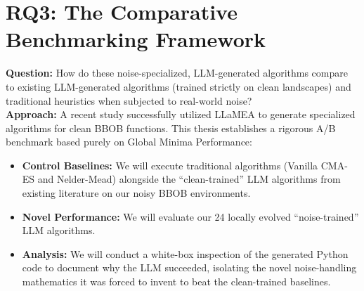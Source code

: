 \section{RQ3: The Comparative Benchmarking Framework}
\textbf{Question:} How do these noise-specialized, LLM-generated algorithms compare to existing LLM-generated algorithms (trained strictly on clean landscapes) and traditional heuristics when subjected to real-world noise? \\
\textbf{Approach:} A recent study successfully utilized LLaMEA to generate specialized algorithms for clean BBOB functions. This thesis establishes a rigorous A/B benchmark based purely on Global Minima Performance:
\begin{itemize}
    \item \textbf{Control Baselines:} We will execute traditional algorithms (Vanilla CMA-ES and Nelder-Mead) alongside the ``clean-trained'' LLM algorithms from existing literature on our noisy BBOB environments.
    \item \textbf{Novel Performance:} We will evaluate our 24 locally evolved ``noise-trained'' LLM algorithms.
    \item \textbf{Analysis:} We will conduct a white-box inspection of the generated Python code to document why the LLM succeeded, isolating the novel noise-handling mathematics it was forced to invent to beat the clean-trained baselines.
\end{itemize}